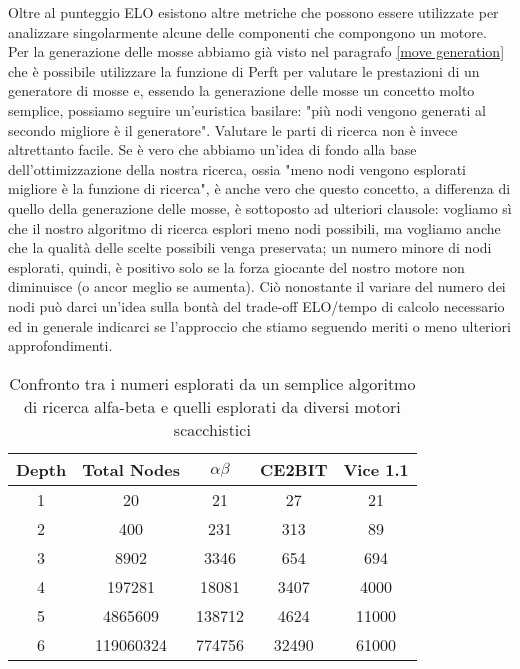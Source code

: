 Oltre al punteggio ELO esistono altre metriche che possono essere utilizzate per analizzare singolarmente alcune delle componenti che compongono un motore.
Per la generazione delle mosse abbiamo già visto nel paragrafo \ref{move generation} che è possibile utilizzare la funzione di Perft per valutare le prestazioni di un generatore di mosse e, essendo la generazione
delle mosse un concetto molto semplice, possiamo seguire un'euristica basilare: "più nodi vengono generati al secondo migliore è il generatore". Valutare le parti 
di ricerca non è invece altrettanto facile. Se è vero che abbiamo un'idea di fondo alla base dell'ottimizzazione della nostra ricerca, ossia "meno nodi vengono esplorati migliore è la funzione di ricerca", è anche vero 
che questo concetto, a differenza di quello della generazione delle mosse, è sottoposto ad ulteriori clausole: vogliamo sì che il nostro algoritmo di ricerca esplori meno nodi possibili, ma vogliamo anche che la qualità
delle scelte possibili venga preservata; un numero minore di nodi esplorati, quindi, è positivo solo se la forza giocante del nostro motore non diminuisce (o ancor meglio se aumenta). Ciò nonostante il variare del numero dei nodi 
può darci un'idea sulla bontà del trade-off ELO/tempo di calcolo necessario ed in generale indicarci se l'approccio che stiamo seguendo meriti o meno ulteriori approfondimenti.
\begin{table}[h]
\begin{center}
    \begin{tabular}{|c|c|c|c|c|} 
     \hline
     Depth & Total Nodes  & $\alpha\beta$ & CE2BIT & Vice 1.1 \\ [0.5ex] 
     \hline
     1 & 20  & 21 & 27 & 21 \\ 
     \hline
     2 & 400  &  231 & 313 & 89\\
     \hline
     3 & 8902  &  3346 & 654 & 694 \\
     \hline
     4 & 197281  & 18081 &  3407 & 4000 \\
     \hline
     5 & 4865609  & 138712 & 4624 & 11000 \\ 
     \hline
     6 & 119060324  & 774756 & 32490 & 61000\\
     \hline
    \end{tabular}
    \caption{Confronto tra i numeri esplorati da un semplice algoritmo di ricerca alfa-beta e quelli esplorati da diversi motori scacchistici} \label{tab:sometab}
    \end{center}
\end{table}


